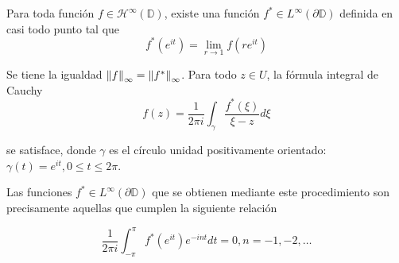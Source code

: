\begin{theorem}
    Para toda función $f \in \mathcal{H}^\infty(\mathbb{D})$, existe una función $f^* \in L^{\infty} (\partial \mathbb{D})$ definida en casi todo punto tal que
    \begin{equation}
        \label{fatou1}
        f^*(e^{it}) = \lim_{r \rightarrow 1} f(re^{it})
    \end{equation}

    Se tiene la igualdad $\left\lVert f\right\rVert_{\infty} = \left\lVert f^*\right\rVert_{\infty}$. Para todo $z \in U$, la fórmula integral de Cauchy
    \begin{equation}
        \label{fatou2}
        f(z) = \dfrac{1}{2 \pi i} \int_{\gamma} \dfrac{f^*(\xi)}{\xi - z} d\xi
    \end{equation}

    se satisface, donde $\gamma$ es el círculo unidad positivamente orientado: $\gamma(t) = e^{it}, 0 \leq t \leq 2 \pi$.

    Las funciones $f^* \in L^{\infty}(\partial \mathbb{D})$ que se obtienen mediante este procedimiento son precisamente aquellas que cumplen la siguiente relación

    \begin{equation}
        \label{fatou3}
        \dfrac{1}{2 \pi i} \int_{-\pi}^{\pi} f^*(e^{it})e^{-int} dt = 0, n = -1,-2, \dots
    \end{equation}
\end{theorem}

